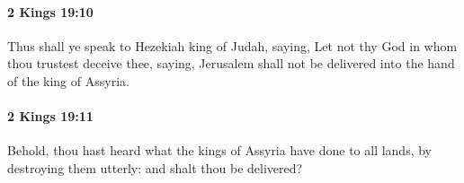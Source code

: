 		\paragraph{2 Kings 19:10} %
			\label{2KINGS-19-10}

			Thus shall ye speak to Hezekiah king of Judah, saying, Let not thy God in whom thou trustest deceive thee, saying, Jerusalem shall not be delivered into the hand of the king of Assyria.


		\paragraph{2 Kings 19:11} %
			\label{2KINGS-19-11}

			Behold, thou hast heard what the kings of Assyria have done to all lands, by destroying them utterly: and shalt thou be delivered?


